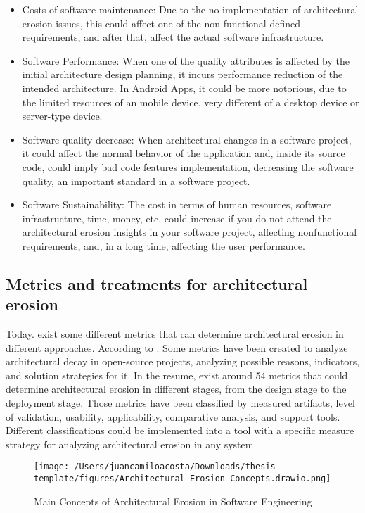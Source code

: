 \begin{itemize}
    \item Costs of software maintenance: Due to the no implementation of architectural erosion issues, this could affect one of the non-functional defined requirements, and after that, affect the actual software infrastructure.
    \item Software Performance: When one of the quality attributes is affected by the initial architecture design planning, it incurs performance reduction of the intended architecture. In Android Apps, it could be more notorious, due to the limited resources of an mobile device, very different of a desktop device or server-type device.
    \item Software quality decrease: When architectural changes in a software project, it could affect the normal behavior of the application and, inside its source code, could imply bad code features implementation, decreasing the software quality, an important standard in a software project.
    \item Software Sustainability: The cost in terms of human resources, software infrastructure, time, money, etc, could increase if you do not attend the architectural erosion insights in your software project, affecting nonfunctional requirements, and, in a long time, affecting the user performance.
\end{itemize}


\subsection{Metrics and treatments for architectural erosion}
Today. exist some different metrics that can determine architectural erosion in different approaches. According to \citet{ieee-erosion-metrics}. Some metrics have been created to analyze architectural decay in open-source projects, analyzing possible reasons, indicators, and solution strategies for it. In the resume, exist around 54 metrics that could determine architectural erosion in different stages, from the design stage to the deployment stage. Those metrics have been classified by measured artifacts, level of validation, usability, applicability, comparative analysis, and support tools. Different classifications could be implemented into a tool with a specific measure strategy for analyzing architectural erosion in any system.

\begin{figure}
    \centering
    \texttt{[image: /Users/juancamiloacosta/Downloads/thesis-template/figures/Architectural Erosion Concepts.drawio.png]}
    \caption{Main Concepts of Architectural Erosion in Software Engineering }
    \label{fig:concept-map}
\end{figure}

